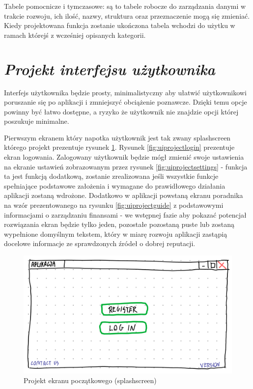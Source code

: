 \documentclass[a4paper,10pt, twoside]{report}
\newcommand{\customstylesection}[1]{\textbf{\textit{#1}}}
\begin{document}
\begin{large}
{Tabele pomocnicze i tymczasowe: są to tabele robocze do zarządzania danymi w 
trakcie rozwoju, ich ilość, nazwy, struktura oraz przeznaczenie mogą się 
zmieniać. Kiedy projektowana funkcja zostanie ukończona tabela wchodzi do użytku
 w ramach którejś z wcześniej opisanych  kategorii.}

\section{\customstylesection{Projekt interfejsu użytkownika}}
{Interfejs użytkownika będzie prosty, minimalistyczny aby ułatwić użytkownikowi 
poruszanie się po aplikacji i zmniejszyć obciążenie poznawcze. Dzięki temu opcje
 powinny być łatwo dostępne, a ryzyko że użytkownik nie znajdzie opcji której 
poszukuje minimalne.}

{Pierwszym ekranem który napotka użytkownik jest tak zwany splashscreen którego 
projekt prezentuje rysunek \ref*{fig:uiprojectsplash}. Rysunek 
\ref*{fig:uiprojectlogin} prezentuje ekran logowania. Zalogowany użytkownik 
będzie mógł zmienić swoje ustawienia na ekranie ustawień zobrazowanym przez 
rysunek \ref*{fig:uiprojectsettings} - funkcja ta jest funkcją dodatkową, 
zostanie zrealizowana jeśli wszystkie funkcje spełniające podstawowe założenia 
i wymagane do prawidłowego działania aplikacji zostaną wdrożone. Dodatkowo w 
aplikacji powstaną ekranu poradnika na wzór prezentowanego na rysunku 
\ref*{fig:uiprojectguide} z podstawowymi informacjami o zarządzaniu finansami - 
we wstępnej fazie aby pokazać potencjał rozwiązania ekran będzie tylko jeden, 
pozostałe pozostaną puste lub zostaną wypełnione domyślnym tekstem, który w 
miarę rozwoju aplikacji zastąpią docelowe informacje ze sprawdzonych źródeł o 
dobrej reputacji.}

\begin{figure}[H]           %
    \centering
    \includegraphics[width=12cm]{figures/Righten_UI_sketch_startscreen.png}
    \caption{Projekt ekranu początkowego (splashscreen)}
    \label{fig:uiprojectsplash}
\end{figure}


\end{large}
\end{document}
